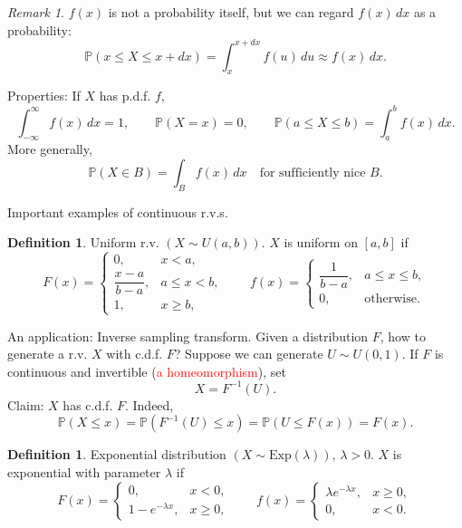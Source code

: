 \documentclass[11pt]{article}
\theoremstyle{plain}
\theoremstyle{definition}
\newtheorem{definition}[theorem]{Definition}
\theoremstyle{remark}
\newtheorem{remark}[theorem]{Remark}
\begin{document}
	\begin{remark}
		\(f(x)\) is not a probability itself, but we can regard \(f(x)\,dx\) as a probability:
		\[
		\mathbb{P}(x\le X\le x+dx)=\int_{x}^{x+dx} f(u)\,du \approx f(x)\,dx.
		\]
	\end{remark}
	
	Properties: If \(X\) has p.d.f. \(f\),
	\[
	\int_{-\infty}^{\infty} f(x)\,dx=1,
	\qquad
	\mathbb{P}(X=x)=0,
	\qquad
	\mathbb{P}(a\le X\le b)=\int_{a}^{b} f(x)\,dx.
	\]
	More generally,
	\[
	\mathbb{P}(X\in B)=\int_{B} f(x)\,dx
	\quad\text{for sufficiently nice }B.
	\]
	
	Important examples of continuous r.v.s.
	
	\begin{definition}
		Uniform r.v. \((X\sim U(a,b))\).
		\(X\) is uniform on \([a,b]\) if
		\[
		F(x)=
		\begin{cases}
			0, & x<a,\\[4pt]
			\dfrac{x-a}{b-a}, & a\le x<b,\\[8pt]
			1, & x\ge b,
		\end{cases}
		\qquad
		f(x)=
		\begin{cases}
			\dfrac{1}{b-a}, & a\le x\le b,\\[8pt]
			0, & \text{otherwise}.
		\end{cases}
		\]
	\end{definition}
	
	An application: Inverse sampling transform.
	Given a distribution \(F\), how to generate a r.v. \(X\) with c.d.f. \(F\)?
	Suppose we can generate \(U\sim U(0,1)\).
	If \(F\) is continuous and invertible (\textcolor{red}{a homeomorphism}), set
	\[
	X=F^{-1}(U).
	\]
	Claim: \(X\) has c.d.f. \(F\). Indeed,
	\[
	\mathbb{P}(X\le x)
	=\mathbb{P}(F^{-1}(U)\le x)
	=\mathbb{P}(U\le F(x))
	=F(x).
	\]
	
	\begin{definition}
		Exponential distribution \((X\sim \mathrm{Exp}(\lambda))\), \(\lambda>0\).
		\(X\) is exponential with parameter \(\lambda\) if
		\[
		F(x)=
		\begin{cases}
			0, & x<0,\\
			1-e^{-\lambda x}, & x\ge 0,
		\end{cases}
		\qquad
		f(x)=
		\begin{cases}
			\lambda e^{-\lambda x}, & x\ge 0,\\
			0, & x<0.
		\end{cases}
		\]
	\end{definition}
	
\end{document}
